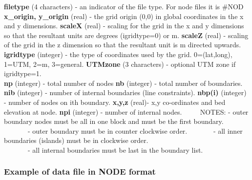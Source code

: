 \documentclass{article}
\begin{document}
\noindent
\textbf{filetype} (4 characters) - an indicator of the file type.  For node files it is \#NOD \newline
\textbf{x\_origin, y\_origin} (real) - the grid origin (0,0) in global coordinates in the x and y dimensions. \newline
\textbf{scaleX} (real) - scaling for the grid in the x and y dimensions so that the resultant units are degrees (igridtype=0) or m. \newline
\textbf{scaleZ} (real) - scaling of the grid in the z dimension so that the resultant unit is m directed upwards.  \newline
\textbf{igridtype} (integer) - the type of coordinates used by the grid. 0=(lat,long), 1=UTM, 2=m, 3=general. \newline
\textbf{UTMzone} (3 characters) - optional UTM zone if igridtype=1. \\
\textbf{np} (integer) - total number of nodes\newline
\textbf{nb} (integer) - total number of boundaries.\newline
\textbf{nib} (integer) - number of internal boundaries (line constraints).\newline
\textbf{nbp(i)} (integer) - number of nodes on ith boundary.\newline
\textbf{x,y,z} (real)- x,y co-ordinates and bed elevation at node.\newline
\textbf{npi} (integer) - number of internal nodes.\newline
 \ \ \ \ \newline
 NOTES: - outer boundary nodes must be all in one block and must be the first boundary.\newline
 \ \ \ \ \ \ \ {}- outer boundary must be in counter clockwise order.\newline
 \ \ \ \ \ \ \ {}- all inner boundaries (islands) must be in clockwise order.\\
\ \ \ \ \ \ \ {}- all internal boundaries must be last in the boundary list.


\subsubsection{Example of data file in NODE format}
\end{document}
